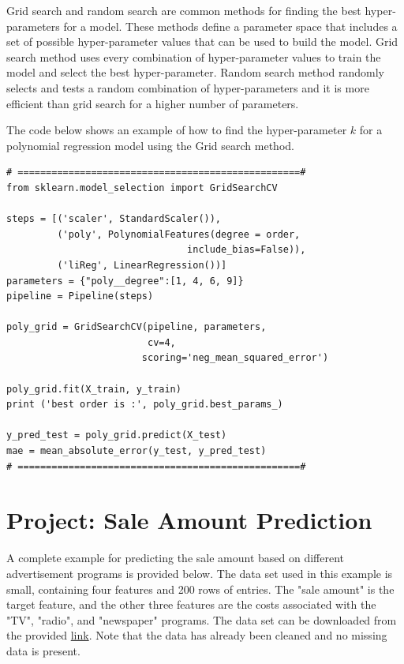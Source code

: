{Grid search and random search are common methods for finding the best hyper-parameters for a model. These methods define a parameter space that includes a set of possible hyper-parameter values that can be used to build the model. Grid search method uses every combination of hyper-parameter values to train the model and select the best hyper-parameter. Random search method randomly selects and tests a random combination of hyper-parameters and it is more efficient than grid search for a higher number of parameters. 

The code below shows an example of how to find the hyper-parameter $k$ for a polynomial regression model using the Grid search method.


\newpage

\begin{lstlisting}
# ==================================================#
from sklearn.model_selection import GridSearchCV

steps = [('scaler', StandardScaler()),
         ('poly', PolynomialFeatures(degree = order,
                                include_bias=False)),
         ('liReg', LinearRegression())]
parameters = {"poly__degree":[1, 4, 6, 9]}
pipeline = Pipeline(steps)

poly_grid = GridSearchCV(pipeline, parameters,
                         cv=4,
                        scoring='neg_mean_squared_error')

poly_grid.fit(X_train, y_train)
print ('best order is :', poly_grid.best_params_)

y_pred_test = poly_grid.predict(X_test)
mae = mean_absolute_error(y_test, y_pred_test)
# ==================================================#
\end{lstlisting}



\newpage
\section{Project: Sale Amount Prediction}\label{sec:LRproject1}

A complete example for predicting the sale amount based on different advertisement programs is provided below. The data set used in this example is small, containing four features and 200 rows of entries. The "sale amount" is the target feature, and the other three features are the costs associated with the "TV", "radio", and "newspaper" programs. The data set can be downloaded from the provided \href{https://www.kaggle.com/sazid28/advertising.csv}{link}\cite{web:adData}. Note that the data has already been cleaned and no missing data is present.

}
